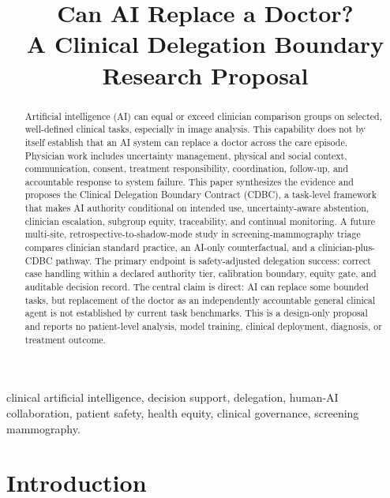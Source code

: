 \documentclass[conference]{IEEEtran}
\begin{document}
\title{Can AI Replace a Doctor?\\
\large A Clinical Delegation Boundary Research Proposal}

\author{
}

\maketitle

\begin{abstract}
Artificial intelligence (AI) can equal or exceed clinician comparison groups on selected, well-defined clinical tasks, especially in image analysis. This capability does not by itself establish that an AI system can replace a doctor across the care episode. Physician work includes uncertainty management, physical and social context, communication, consent, treatment responsibility, coordination, follow-up, and accountable response to system failure. This paper synthesizes the evidence and proposes the Clinical Delegation Boundary Contract (CDBC), a task-level framework that makes AI authority conditional on intended use, uncertainty-aware abstention, clinician escalation, subgroup equity, traceability, and continual monitoring. A future multi-site, retrospective-to-shadow-mode study in screening-mammography triage compares clinician standard practice, an AI-only counterfactual, and a clinician-plus-CDBC pathway. The primary endpoint is safety-adjusted delegation success: correct case handling within a declared authority tier, calibration boundary, equity gate, and auditable decision record. The central claim is direct: AI can replace some bounded tasks, but replacement of the doctor as an independently accountable general clinical agent is not established by current task benchmarks. This is a design-only proposal and reports no patient-level analysis, model training, clinical deployment, diagnosis, or treatment outcome.
\end{abstract}

\begin{IEEEkeywords}
clinical artificial intelligence, decision support, delegation, human-AI collaboration, patient safety, health equity, clinical governance, screening mammography.
\end{IEEEkeywords}

\section{Introduction}
\end{document}
